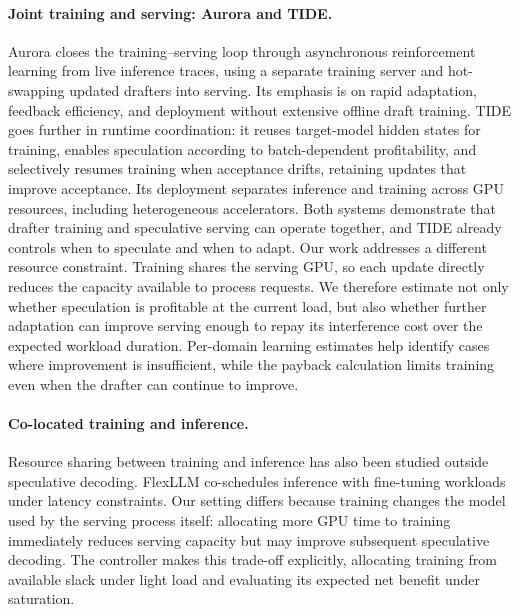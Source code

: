 \documentclass{article}
\begin{document}
\paragraph{Joint training and serving: Aurora and TIDE.}
Aurora \citep{wang2026aurora} closes the training--serving loop through asynchronous reinforcement learning from live inference traces, using a separate training server and hot-swapping updated drafters into serving. Its emphasis is on rapid adaptation, feedback efficiency, and deployment without extensive offline draft training. TIDE \citep{park2026tide} goes further in runtime coordination: it reuses target-model hidden states for training, enables speculation according to batch-dependent profitability, and selectively resumes training when acceptance drifts, retaining updates that improve acceptance. Its deployment separates inference and training across GPU resources, including heterogeneous accelerators. Both systems demonstrate that drafter training and speculative serving can operate together, and TIDE already controls when to speculate and when to adapt. Our work addresses a different resource constraint. Training shares the serving GPU, so each update directly reduces the capacity available to process requests. We therefore estimate not only whether speculation is profitable at the current load, but also whether further adaptation can improve serving enough to repay its interference cost over the expected workload duration. Per-domain learning estimates help identify cases where improvement is insufficient, while the payback calculation limits training even when the drafter can continue to improve.

\paragraph{Co-located training and inference.}
Resource sharing between training and inference has also been studied outside speculative decoding. FlexLLM \citep{oliaro2024flexllm} co-schedules inference with fine-tuning workloads under latency constraints. Our setting differs because training changes the model used by the serving process itself: allocating more GPU time to training immediately reduces serving capacity but may improve subsequent speculative decoding. The controller makes this trade-off explicitly, allocating training from available slack under light load and evaluating its expected net benefit under saturation.

\end{document}
